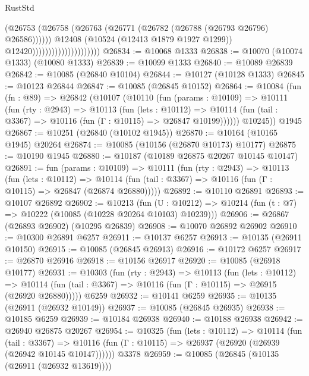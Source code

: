 \begin{lexlean}{RustStd}
\begin{coremodule}
                                              (@26753
                                                (@26758
                                                  (@26763
                                                    (@26771
                                                      (@26782 (@26788 (@26793 @26796) @26586))))))
                                              @12408
                                              (@10524 (@12413 @1879 @1927 @1299))
                                              @12420)))))))))))))))))))))
@26834 := @10068 @1333
@26838 := @10070 (@10074 @1333) (@10080 @1333)
@26839 := @10099 @1333
@26840 := @10089 @26839
@26842 := @10085 (@26840 @10104)
@26844 := @10127 (@10128 @1333)
@26845 := @10123 @26844
@26847 := @10085 (@26845 @10152)
@26864 := @10084
    (fun (fn : @89) =>
    @26842
      (@10107
        (@10110
          (fun (params : @10109) =>
          @10111
            (fun (rty : @2943) =>
            @10113
              (fun (lets : @10112) =>
              @10114 (fun (tail : @3367) => @10116 (fun (Γ : @10115) => @26847 @10199))))))
        @10245))
    @1945
@26867 := @10251 (@26840 (@10102 @1945))
@26870 := @10164 (@10165 @1945) @20264
@26874 := @10085 (@10156 (@26870 @10173) @10177)
@26875 := @10190 @1945
@26880 := @10187 (@10189 @26875 @20267 @10145 @10147)
@26891 := fun (params : @10109) =>
  @10111
    (fun (rty : @2943) =>
    @10113
      (fun (lets : @10112) =>
      @10114 (fun (tail : @3367) => @10116 (fun (Γ : @10115) => @26847 (@26874 @26880)))))
@26892 := @10110 @26891
@26893 := @10107 @26892
@26902 := @10213
    (fun (U : @10212) => @10214 (fun (t : @7) => @10222 (@10085 (@10228 @20264 @10103) @10239)))
@26906 := @26867 (@26893 @26902) (@10295 @26839)
@26908 := @10070 @26892 @26902
@26910 := @10300 @26891 @6257
@26911 := @10137 @6257
@26913 := @10135 (@26911 @10150)
@26915 := @10085 (@26845 @26913)
@26916 := @10172 @6257
@26917 := @26870 @26916
@26918 := @10156 @26917
@26920 := @10085 (@26918 @10177)
@26931 := @10303
    (fun (rty : @2943) =>
    @10113
      (fun (lets : @10112) =>
      @10114 (fun (tail : @3367) => @10116 (fun (Γ : @10115) => @26915 (@26920 @26880)))))
    @6259
@26932 := @10141 @6259
@26935 := @10135 (@26911 (@26932 @10149))
@26937 := @10085 (@26845 @26935)
@26938 := @10185 @6259
@26939 := @10184 @26938
@26940 := @10188 @26938
@26942 := @26940 @26875 @20267
@26954 := @10325
    (fun (lets : @10112) =>
    @10114
      (fun (tail : @3367) =>
      @10116 (fun (Γ : @10115) => @26937 (@26920 (@26939 (@26942 @10145 @10147))))))
    @3378
@26959 := @10085 (@26845 (@10135 (@26911 (@26932 @13619))))

\end{coremodule}
\end{lexlean}
